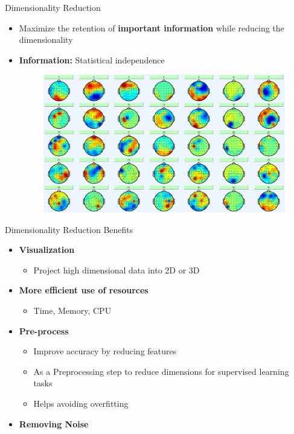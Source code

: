 \documentclass[serif, aspectratio=169]{beamer}
\begin{document}
\begin{frame}{Dimensionality Reduction}
    \begin{itemize}
        \item Maximize the retention of  \textbf{important information} while reducing the dimensionality
        \item \textbf{Information:} Statistical independence
        \begin{figure}[htpb]
                \begin{center}
                    \includegraphics[keepaspectratio, scale=0.25]{pic/dim_red_independent.JPG}
                \end{center}
        \end{figure}
    \end{itemize}
\end{frame}

\begin{frame}{Dimensionality Reduction Benefits}
    \begin{itemize}
        \item \textbf{Visualization}
            \begin{itemize}
                \item Project high dimensional data into 2D or 3D
            \end{itemize}
        \item \textbf{More efficient use of resources}
            \begin{itemize}
                \item Time, Memory, CPU
            \end{itemize}
        \item \textbf{Pre-process}
            \begin{itemize}
                \item Improve accuracy by reducing features
                \item As a Preprocessing step to reduce dimensions for supervised learning tasks
                \item Helps avoiding overfitting
            \end{itemize}
        \item \textbf{Removing Noise}
    \end{itemize}
\end{frame}
\end{document}
